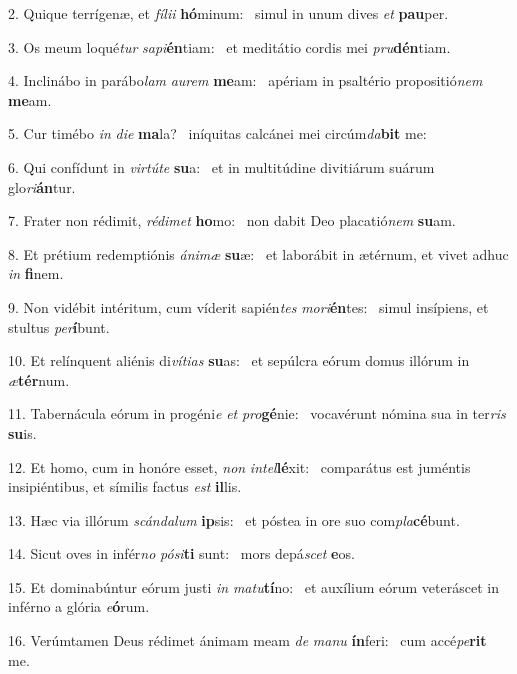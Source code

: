 2. Quique terrígenæ, et \textit{fí}\textit{li}\textit{i} \textbf{hó}minum: \ast\  simul in unum dives \textit{et} \textbf{pau}per.\

3. Os meum loqué\textit{tur} \textit{sa}\textit{pi}\textbf{én}tiam: \ast\  et meditátio cordis mei \textit{pru}\textbf{dén}tiam.\

4. Inclinábo in parábo\textit{lam} \textit{au}\textit{rem} \textbf{me}am: \ast\  apériam in psaltério propositió\textit{nem} \textbf{me}am.\

5. Cur timébo \textit{in} \textit{di}\textit{e} \textbf{ma}la? \ast\  iníquitas calcánei mei circúm\textit{da}\textbf{bit} me:\

6. Qui confídunt in \textit{vir}\textit{tú}\textit{te} \textbf{su}a: \ast\  et in multitúdine divitiárum suárum glo\textit{ri}\textbf{án}tur.\

7. Frater non rédimit, \textit{réd}\textit{i}\textit{met} \textbf{ho}mo: \ast\  non dabit Deo placatió\textit{nem} \textbf{su}am.\

8. Et prétium redemptiónis \textit{á}\textit{ni}\textit{mæ} \textbf{su}æ: \ast\  et laborábit in ætérnum, et vivet adhuc \textit{in} \textbf{fi}nem.\

9. Non vidébit intéritum, cum víderit sapién\textit{tes} \textit{mo}\textit{ri}\textbf{én}tes: \ast\  simul insípiens, et stultus \textit{per}\textbf{í}bunt.\

10. Et relínquent aliénis di\textit{ví}\textit{ti}\textit{as} \textbf{su}as: \ast\  et sepúlcra eórum domus illórum in \textit{æ}\textbf{tér}num.\

11. Tabernácula eórum in progéni\textit{e} \textit{et} \textit{pro}\textbf{gé}nie: \ast\  vocavérunt nómina sua in ter\textit{ris} \textbf{su}is.\

12. Et homo, cum in honóre esset, \textit{non} \textit{in}\textit{tel}\textbf{lé}xit: \ast\  comparátus est juméntis insipiéntibus, et símilis factus \textit{est} \textbf{il}lis.\

13. Hæc via illórum \textit{scán}\textit{da}\textit{lum} \textbf{ip}sis: \ast\  et póstea in ore suo com\textit{pla}\textbf{cé}bunt.\

14. Sicut oves in infér\textit{no} \textit{pó}\textit{si}\textbf{ti} sunt: \ast\  mors depá\textit{scet} \textbf{e}os.\

15. Et dominabúntur eórum justi \textit{in} \textit{ma}\textit{tu}\textbf{tí}no: \ast\  et auxílium eórum veteráscet in inférno a glória \textit{e}\textbf{ó}rum.\

16. Verúmtamen Deus rédimet ánimam meam \textit{de} \textit{ma}\textit{nu} \textbf{ín}feri: \ast\  cum accé\textit{pe}\textbf{rit} me.\


